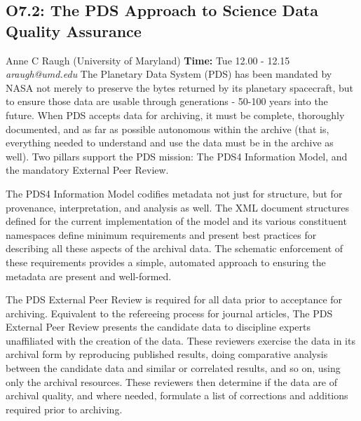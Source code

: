 \documentclass{report}
\begin{document}
\subsection*{O7.2: The PDS Approach to Science  Data Quality Assurance}
\bigskip
Anne C Raugh (University of Maryland) \newline   \newline   \newline   \newline  \newline  \newline\newline
{\bf Time:} Tue 12.00 - 12.15\newline
\newline
{\it araugh@umd.edu}\newline
\newline\newline
The Planetary Data System (PDS) has been mandated by NASA not merely to preserve the bytes returned by its planetary spacecraft, but to ensure those data are usable through generations - 50-100 years into the future. When PDS accepts data for archiving, it must be complete, thoroughly documented, and as far as possible autonomous within the archive (that is, everything needed to understand and use the data must be in the archive as well).  Two pillars support the PDS mission: The PDS4 Information Model, and the mandatory External Peer Review.

The PDS4 Information Model codifies metadata not just for structure, but for provenance, interpretation, and analysis as well.  The XML document structures defined for the current implementation of the model and its various constituent namespaces define minimum requirements and present best practices for describing all these aspects of the archival data. The schematic enforcement of these requirements provides a simple, automated approach to ensuring the metadata are present and well-formed.

The PDS External Peer Review is required for all data prior to acceptance for archiving.  Equivalent to the refereeing process for journal articles, The PDS External Peer Review presents the candidate data to discipline experts unaffiliated with the creation of the data.  These reviewers exercise the data in its archival form by reproducing published results, doing comparative analysis between the candidate data and similar or correlated results, and so on, using only the archival resources.  These reviewers then determine if the data are of archival quality, and where needed, formulate a list of corrections and additions required prior to archiving.
\end{document}
